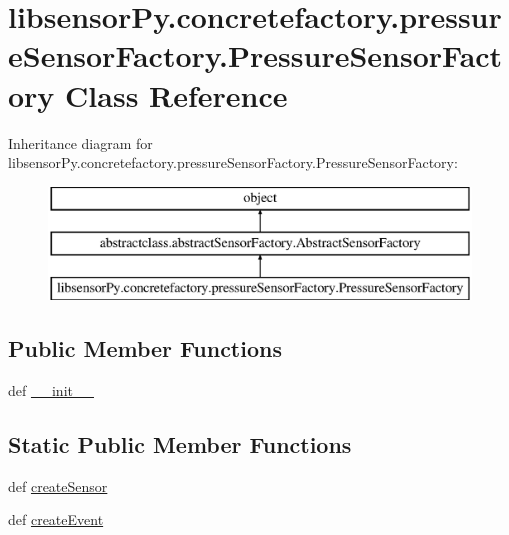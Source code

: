 \hypertarget{classlibsensorPy_1_1concretefactory_1_1pressureSensorFactory_1_1PressureSensorFactory}{}\section{libsensor\+Py.\+concretefactory.\+pressure\+Sensor\+Factory.\+Pressure\+Sensor\+Factory Class Reference}
\label{classlibsensorPy_1_1concretefactory_1_1pressureSensorFactory_1_1PressureSensorFactory}
Inheritance diagram for libsensor\+Py.\+concretefactory.\+pressure\+Sensor\+Factory.\+Pressure\+Sensor\+Factory\+:\begin{figure}[H]
\begin{center}
\leavevmode
\includegraphics[height=3.000000cm]{classlibsensorPy_1_1concretefactory_1_1pressureSensorFactory_1_1PressureSensorFactory}
\end{center}
\end{figure}
\subsection*{Public Member Functions}
\begin{DoxyCompactItemize}
\item 
def \hyperlink{classlibsensorPy_1_1concretefactory_1_1pressureSensorFactory_1_1PressureSensorFactory_a73c6733617464999937653f5e5038a4d}{\+\_\+\+\_\+init\+\_\+\+\_\+}
\end{DoxyCompactItemize}
\subsection*{Static Public Member Functions}
\begin{DoxyCompactItemize}
\item 
def \hyperlink{classlibsensorPy_1_1concretefactory_1_1pressureSensorFactory_1_1PressureSensorFactory_a64cdfcb6a9cd277af6770ddd6d009776}{create\+Sensor}
\item 
def \hyperlink{classlibsensorPy_1_1concretefactory_1_1pressureSensorFactory_1_1PressureSensorFactory_aef3e78fae9de804071f84c579574f4e7}{create\+Event}
\end{DoxyCompactItemize}


